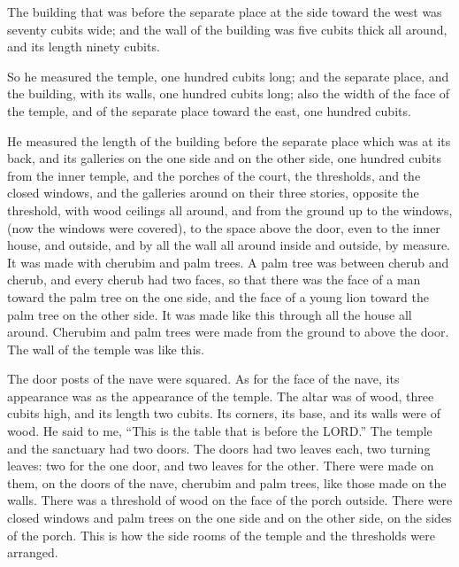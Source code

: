 \myverse{}The building that was before the separate place at the side
toward the west was seventy cubits wide; and the wall of the building was five cubits thick all around,
and its length ninety cubits.

\myverse{}So he measured the temple, one hundred cubits long; and the
separate place, and the building, with its walls, one hundred cubits long;
\myverse{}also the width of the face of the temple, and of the separate place toward
the east, one hundred cubits.

\myverse{}He measured the length of the building before the separate place
which was at its back, and its galleries on the one side and on the other side, one hundred cubits from
the inner temple, and the porches of the court,
\myverse{}the thresholds, and the closed windows, and the galleries around on their
three stories, opposite the threshold, with wood ceilings all around, and from the ground up to the windows,
(now the windows were covered),
\myverse{}to the space above the door, even to the inner house, and outside, and by
all the wall all around inside and outside, by measure.
\myverse{}It was made with cherubim and palm trees. A palm tree was between cherub
and cherub, and every cherub had two faces,
\myverse{}so that there was the face of a man toward the palm tree on the one side,
and the face of a young lion toward the palm tree on the other side. It was made like this through all
the house all around.
\myverse{}Cherubim and palm trees were made from the ground to above the door. The
wall of the temple was like this.

\myverse{}The door posts of the nave were squared. As for the face of
the nave, its appearance was as the appearance of the temple.
\myverse{}The altar was of wood, three cubits high, and its length two cubits. Its
corners, its base, and its walls were of wood. He said to me, “This is the table that is before the LORD.”
\myverse{}The temple and the sanctuary had two doors.
\myverse{}The doors had two leaves each, two turning leaves: two for the one door,
and two leaves for the other.
\myverse{}There were made on them, on the doors of the nave, cherubim and palm trees,
like those made on the walls. There was a threshold of wood on the face of the porch outside.
\myverse{}There were closed windows and palm trees on the one side and on the other
side, on the sides of the porch. This is how the side rooms of the temple and the thresholds were arranged.


